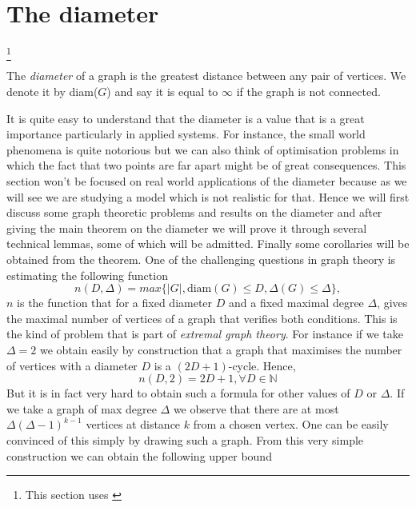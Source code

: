 \section{The diameter}
\footnote{This section uses \cite{Bollob01}}
\begin{definition}
	The \emph{diameter} of a graph is the greatest distance between any pair of vertices. We denote it by diam($G$) and say it is equal to $\infty$ if the graph is not connected.
\end{definition}
It is quite easy to understand that the diameter is a value that is a great importance particularly in applied systems. For instance, the small world phenomena is quite notorious but we can also think of optimisation problems in which the fact that two points are far apart might be of great consequences.
This section won't be focused on real world applications of the diameter because as we will see we are studying a model which is not realistic for that. 
Hence we will first discuss some graph theoretic problems and results on the diameter and after giving the main theorem on the diameter we will prove it through several technical lemmas, some of which will be admitted. Finally some corollaries will be obtained from the theorem.
\newline
One of the challenging questions in graph theory is estimating the following function
\begin{equation}\label{eq:DDeltaProb}
	n(D, \Delta) = max\{ |G|, \text{diam}(G) \leq D, \Delta(G) \leq \Delta\},
\end{equation}
$n$ is the function that for a fixed diameter $D$ and a fixed maximal degree $\Delta$, gives the maximal number of vertices of a graph that verifies both conditions. This is the kind of problem that is part of \emph{extremal graph theory}.
\newline
For instance if we take $\Delta = 2$ we obtain easily by construction that a graph that maximises the number of vertices with a diameter $D$ is a $(2D+1)$-cycle. Hence, 
\begin{equation}
	n(D, 2) = 2D + 1, \forall D \in \mathbb{N}
\end{equation}
But it is in fact very hard to obtain such a formula for other values of $D$ or $\Delta$.
\newline
If we take a graph of max degree $\Delta$ we observe that there are at most $\Delta (\Delta - 1)^{k-1}$ vertices at distance $k$ from a chosen vertex.
One can be easily convinced of this simply by drawing such a graph. 
From this very simple construction we can obtain the following upper bound
